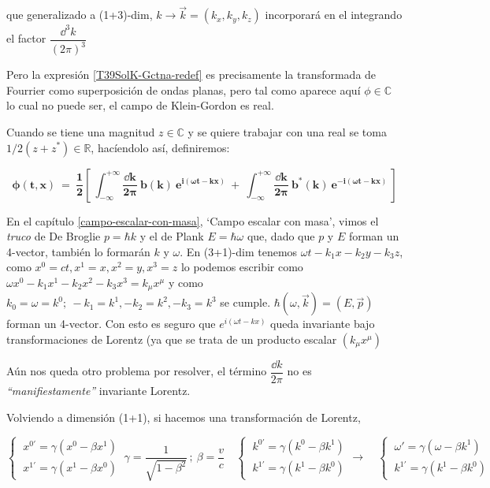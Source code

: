 que generalizado a (1+3)-dim, $k\to \vec k=(k_x,k_y,k_z)$ incorporará en el integrando el factor $\dfrac{\dd^3k}{(2\pi)^3}$

Pero la expresión \ref{T39SolK-Gctna-redef} es precisamente la transformada de Fourrier como superposición de ondas planas, pero tal como aparece aquí $\phi \in \mathbb C$ lo cual no puede ser, el campo de Klein-Gordon es real.

Cuando se tiene una magnitud $z\in \mathbb C$ y se quiere trabajar con una real se toma $1/2(z+z^*) \in \mathbb R$, hacíendolo así, definiremos:

\begin{equation}
\label{T39SolK-Gctna-redef-R}
\boldsymbol{
\phi(t,x) \ = \ \dfrac 1 2  \left[\  \int_{-\infty}^{+\infty} \dfrac{\dd k}{2\pi} \ b(k)\ e^{i(\omega t-kx)} \  + \  \int_{-\infty}^{+\infty} \dfrac{\dd k}{2\pi} \ b^*(k)\ e^{-i(\omega t-kx)}  \ \right]
}	
\end{equation}


En el capítulo \ref{campo-escalar-con-masa}, `Campo escalar con masa', vimos el \emph{truco} de De Broglie $p=\hbar k$ y el de Plank $E=\hbar \omega$ que, dado que $p$ y $E$ forman un 4-vector, también lo formarán $k$ y $\omega$. En (3+1)-dim tenemos $\omega t-k_1x-k_2y-k_3z$, como $x^0=ct, x^1=x,x^2=y,x^3=z$ lo podemos escribir como $\omega x^0-k_1x^1-k_2x^2-k_3x^3=k_\mu x^\mu$ y como $k_0=\omega=k^0;\ -k_1=k^1,-k_2=k^2,-k_3=k^3$ se cumple. $\hbar(\omega,\vec k)=(E,\vec p)$ forman un 4-vector. Con esto es seguro que $e^{i(\omega t-kx)}$ queda invariante bajo transformaciones de Lorentz (ya que se trata de un producto escalar $(k_\mu x^\mu)$

Aún nos queda otro problema por resolver, el término $\dfrac {\dd k}{2\pi}$ no es \emph{``manifiestamente''} invariante Lorentz.

Volviendo a dimensión (1+1), si hacemos una transformación de Lorentz,

$\begin{cases} \ x^{0'}=\gamma(x^0-\beta x^1) \\ \ x^{1'}=\gamma(x^1-\beta x^0) \end{cases} \ \gamma=\dfrac 1 {\sqrt{1-\beta^2}}\, ; \ \beta=\dfrac v c \quad \begin{cases} \ k^{0'}=\gamma(k^0-\beta k ^1) \\ \ k^{1'}=\gamma(k^1-\beta k^0) \end{cases} \to \quad \begin{cases} \  \omega'=\gamma(\omega-\beta k^1) \\ \ k^{1'}=\gamma(k^1-\beta k^0) \end{cases}$

